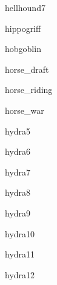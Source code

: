 \documentclass[letterpaper,serif]{module}
\begin{document}
\begin{newmonster}{hellhound7}\end{newmonster}

\begin{newmonster}{hippogriff}\end{newmonster}

\begin{newmonster}{hobgoblin}\end{newmonster}

\begin{newmonster}{horse_draft}\end{newmonster}

\begin{newmonster}{horse_riding}\end{newmonster}

\begin{newmonster}{horse_war}\end{newmonster}

\begin{newmonster}{hydra5}\end{newmonster}

\begin{newmonster}{hydra6}\end{newmonster}

\begin{newmonster}{hydra7}\end{newmonster}

\begin{newmonster}{hydra8}\end{newmonster}

\begin{newmonster}{hydra9}\end{newmonster}

\begin{newmonster}{hydra10}\end{newmonster}

\begin{newmonster}{hydra11}\end{newmonster}

\begin{newmonster}{hydra12}\end{newmonster}
\end{document}
